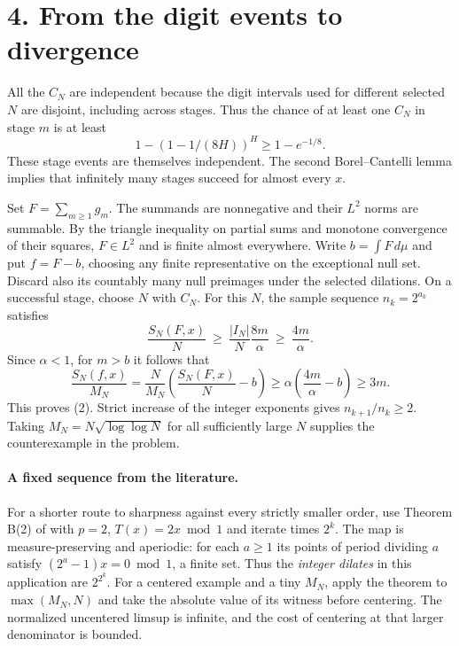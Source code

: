 \documentclass[11pt]{article}
\newcommand{\1}{\mathbf 1}
\begin{document}
\newpage
\section*{4. From the digit events to divergence}
All the $C_N$ are independent because the digit intervals used for
different selected $N$ are disjoint, including across stages. Thus
the chance of at least one $C_N$ in stage $m$ is at least
\[
              1-(1-1/(8H))^H\ge 1-e^{-1/8}.
\]
These stage events are themselves independent. The second
Borel--Cantelli lemma implies that infinitely many stages succeed
for almost every $x$.

Set $F=\sum_{m\ge1}g_m$. The summands are nonnegative and their
$L^2$ norms are summable. By the triangle inequality on partial sums
and monotone convergence of their squares, $F\in L^2$ and is finite
almost everywhere. Write $b=\int F\,d\mu$ and put $f=F-b$,
choosing any finite representative on the exceptional null set.
Discard also its countably many null preimages under the selected
dilations. On a successful stage, choose $N$ with $C_N$. For this $N$,
the sample sequence $n_k=2^{a_k}$ satisfies
\[
 \frac{S_N(F,x)}{N}\ \ge\ \frac{|I_N|}{N}\frac{8m}{\alpha}
                  \ \ge\ \frac{4m}{\alpha}.
\]
Since $\alpha<1$, for $m>b$ it follows that
\[
 \frac{S_N(f,x)}{M_N}
   =\frac{N}{M_N}\left(\frac{S_N(F,x)}{N}-b\right)
   \ge\alpha\left(\frac{4m}{\alpha}-b\right)\ge 3m .
\]
This proves (2). Strict increase of the integer exponents gives
$n_{k+1}/n_k\ge2$. Taking $M_N=N\sqrt{\log\log N}$ for all sufficiently
large $N$ supplies the counterexample in the problem.

\paragraph{A fixed sequence from the literature.}
For a shorter route to sharpness against every strictly smaller order,
use Theorem B(2) of \cite{QW} with $p=2$, $T(x)=2x\bmod1$ and
iterate times $2^k$. The map is measure-preserving and aperiodic:
for each $a\ge1$ its points of period dividing $a$ satisfy
$(2^a-1)x=0\bmod1$, a finite set. Thus the \emph{integer dilates}
in this application are $2^{2^k}$. For a centered example and a tiny
$M_N$, apply the theorem to $\max(M_N,N)$ and take the absolute value
of its witness before centering. The normalized uncentered limsup is
infinite, and the cost of centering at that larger denominator is bounded.
\end{document}
